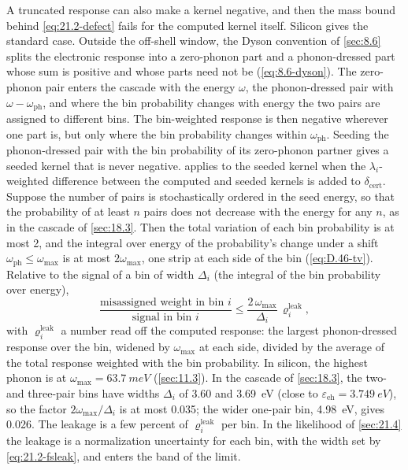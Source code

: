 A truncated response can also make a kernel negative, and then the mass bound behind \cref{eq:21.2-defect} fails for the computed kernel itself. Silicon gives the standard case. Outside the off-shell window, the Dyson convention of \cref{sec:8.6} splits the electronic response into a zero-phonon part and a phonon-dressed part whose sum is positive and whose parts need not be (\cref{eq:8.6-dyson}). The zero-phonon pair enters the cascade with the energy $\omega$, the phonon-dressed pair with $\omega - \omega_{\mathrm{ph}}$, and where the bin probability changes with energy the two pairs are assigned to different bins. The bin-weighted response is then negative wherever one part is, but only where the bin probability changes within $\omega_{\mathrm{ph}}$. Seeding the phonon-dressed pair with the bin probability of its zero-phonon partner gives a seeded kernel that is never negative.  applies to the seeded kernel when the $\lambda_i$-weighted difference between the computed and seeded kernels is added to $\delta_{\mathrm{cert}}$. Suppose the number of pairs is stochastically ordered in the seed energy, so that the probability of at least $n$ pairs does not decrease with the energy for any $n$, as in the cascade of \cref{sec:18.3}. Then the total variation of each bin probability is at most 2, and the integral over energy of the probability's change under a shift $\omega_{\mathrm{ph}} \le \omega_{\mathrm{max}}$ is at most $2\omega_{\mathrm{max}}$, one strip at each side of the bin (\cref{eq:D.46-tv}). Relative to the signal of a bin of width $\Delta_i$ (the integral of the bin probability over energy),
\begin{equation}
  \frac{\text{misassigned weight in bin }i}{\text{signal in bin }i} \le \frac{2\,\omega_{\mathrm{max}}}{\Delta_i}\,\varrho^{\mathrm{leak}}_i ,
  \label{eq:21.2-fsleak}
\end{equation}
with $\varrho^{\mathrm{leak}}_i$ a number read off the computed response: the largest phonon-dressed response over the bin, widened by $\omega_{\mathrm{max}}$ at each side, divided by the average of the total response weighted with the bin probability. In silicon, the highest phonon is at $\omega_{\mathrm{max}} = \SI{63.7}{meV}$ (\cref{sec:11.3}). In the cascade of \cref{sec:18.3}, the two- and three-pair bins have widths $\Delta_i$ of 3.60 and \SI{3.69}{eV} (close to $\varepsilon_{\mathrm{eh}} = \SI{3.749}{eV}$), so the factor $2\omega_{\mathrm{max}}/\Delta_i$ is at most 0.035; the wider one-pair bin, \SI{4.98}{eV}, gives 0.026. The leakage is a few percent of $\varrho^{\mathrm{leak}}_i$ per bin. In the likelihood of \cref{sec:21.4} the leakage is a normalization uncertainty for each bin, with the width set by \cref{eq:21.2-fsleak}, and enters the band of the limit.
